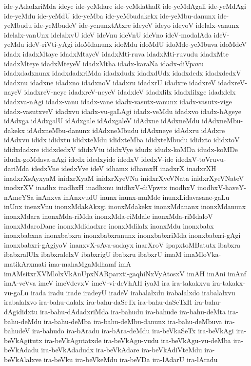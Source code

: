 {ide-yAdadxriMda
ideye
ide-yeMdare
ide-yeMdathaR
ide-yeMdAgali
ide-yeMdAgi
ide-yeMdu
ide-yeMdU
ide-yeMba
ide-yeMbudakekx
ide-yeMbu-danunx
ide-yeMbudu
ide-yeMbudeV
ide-yenunxtAtxre
ideyeV
ideyo
ideyoV
idelalx-vanunx
idelalx-vanUnx
idelalxvU
ideV
ideVnu
ideVnU
ideVno
ideV-modalAda
ideV-yeMdu
ideV-riVti-yAgi
idoMdanunx
idoMdu
idoMdU
idoMde-yeMbuva
idoMdeV
idadx
idadxMtaye
idadxMtayeV
idadxMti-ruva
idadxMti-ruvudu
idadxMte
idadxMteye
idadxMteyeV
idadxMtha
idadx-karaNa
idadx-diVpavu
idadxdadxnunx
idadxdadxriMda
idadxdudx
idadxdUdx
idadxdedx
idadxdedxV
idadxnu
idadxne
idadxno
idadxnoV
idadxru
idadxrU
idadxre
idadxreV
idadxreV-nayeV
idadxreV-neye
idadxreV-neyeV
idadxleV
idadxlilx
idadxlilxge
idadxlelx
idadxva-nAgi
idadx-vanu
idadx-vane
idadx-vasutx-vanunx
idadx-vasutx-vige
idadx-vasutxveV
idadxvu
idadx-vu-gaLAgi
idadx-veMdu
idadxvo
idadx-hAgeye
idAdxga
idAdxgalU
idAdxgale
idAdxgaleV
idAdxne
idAdxneMdu
idAdxneMbu-dakekx
idAdxneMbu-danunx
idAdxneMbudu
idAdxneye
idAdxru
idAdxre
idAdxvu
ididx
ididxtu
ididxteMdu
ididxteMba
ididxteMbudu
ididxto
ididxtoV
ididxdadxre
ididxdedxV
ididxVtu
ididxVye
idudx
idudx-koMDa
idudx-koMDe
idudx-goMdava-nAgi
idedx
idedxyide
idedxV
idedxV-ide
idedxV-toVruvu-dariMda
idedxVne
idedxVve
ideV
idhamx
idhamxH
inadxrX
inadxrXH
inadxrXsAyxyaM
inidxrXyaM
inidxrXyeVNa
inidxrXyeVNata
inidxrXyeVNateV
inodxrXV
inadhx
inadhxH
inadhxnu
inidhxV-diVpwtx
inodhxV
inodhxV-haveY-nAmeYSa
inAnxva
inAnxvudU
inunx
inunx-muMde
inunxLidavasane-gaLu
inUnx
inenxVnu
inonxMdakAkxgi
inonxMdakekx
inonxMdananx
inonxMdanunx
inonxMdara
inonxMda-riMda
inonxMda-riMdale
inonxMda-riMdaloV
inonxMdaroDane
inonxMdidadxre
inonxMdilalx
inonxMdu
inonxbabx
inonxbabxna
inonxbabxra
inonxbabxranunx
inonxbabxriMda
inonxbabxri-gAgi
inonxbabxri-gAgiyoV
inanxvX-sAva-sadayx
inarXroV
ipapxtoMBatutx
ibabxra
ibabxralUlx
ibabxralelxV
ibabxrigU
ibabxru
ibabxrU
imaM
imaMloVka-matikArxmati
ima-mahaMgaMdhamf
imA
imAMsitxrXVMlolxVkAnUpxNARparxti-gaqhiNxVyAtosxV
imAH
imAni
imAnf
imA-veVva
imeV
imeVdevxV
imeV-vi-deVhAH
iyaM
ira
ira-takakxvu
ira-takakx-vu-gaLu
irada
iradu
irade
iradeyU
iradeV
irabalalxdu
irabalalxdo
irabalalxvu
irabalalxvo
ira-bahu-dalalx
ira-bahu-daSeTx
ira-bahu-daSeTxH
ira-bahu-dAgididxtu
ira-bahu-dAdadxriMda
ira-bahudu
ira-bahude
ira-bahu-deMta
ira-bahu-deMdu
ira-bahu-deMba
ira-bahu-deMbu-danunx
ira-bahu-deMbuva
ira-bahudeV
ira-bahudo
ira-bAradu
ira-bAra-deMdu
ira-beVkaSeTx
ira-beVkAgi
ira-beVkAgitutx
ira-beVkAgutatxde
ira-beVkAgu-vudu
ira-beVkAgu-vu-deMba
ira-beVkAdadu
ira-beVkAdadudx
ira-beVkAdare
ira-beVkAdiVteMdu
ira-beVkAlalxve
ira-beVku
ira-beVkeMdu
ira-beVDa
ira-lAdarU
ira-lAradu
}
